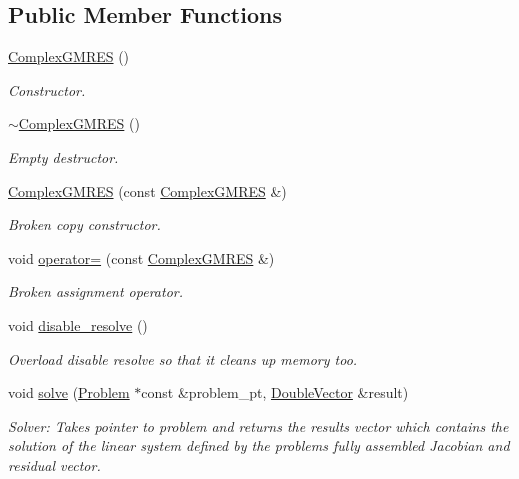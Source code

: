 \subsection*{Public Member Functions}
\begin{DoxyCompactItemize}
\item 
\hyperlink{classoomph_1_1ComplexGMRES_a8d0bfc83e16222c1eee97d8118505bae}{Complex\+G\+M\+R\+ES} ()
\begin{DoxyCompactList}\small\item\em Constructor. \end{DoxyCompactList}\item 
\hyperlink{classoomph_1_1ComplexGMRES_ade91020000a1b6bf316ff9753ac6498b}{$\sim$\+Complex\+G\+M\+R\+ES} ()
\begin{DoxyCompactList}\small\item\em Empty destructor. \end{DoxyCompactList}\item 
\hyperlink{classoomph_1_1ComplexGMRES_a834e97a93d141ece73e4f3aac2e8cd00}{Complex\+G\+M\+R\+ES} (const \hyperlink{classoomph_1_1ComplexGMRES}{Complex\+G\+M\+R\+ES} \&)
\begin{DoxyCompactList}\small\item\em Broken copy constructor. \end{DoxyCompactList}\item 
void \hyperlink{classoomph_1_1ComplexGMRES_a1b42167d4635b2ca294ed7aa843e9de5}{operator=} (const \hyperlink{classoomph_1_1ComplexGMRES}{Complex\+G\+M\+R\+ES} \&)
\begin{DoxyCompactList}\small\item\em Broken assignment operator. \end{DoxyCompactList}\item 
void \hyperlink{classoomph_1_1ComplexGMRES_a07db774f0aca4e71579c7c071e25a451}{disable\+\_\+resolve} ()
\begin{DoxyCompactList}\small\item\em Overload disable resolve so that it cleans up memory too. \end{DoxyCompactList}\item 
void \hyperlink{classoomph_1_1ComplexGMRES_a76987ec784cd80e6605c63ef8d0ec6b7}{solve} (\hyperlink{classoomph_1_1Problem}{Problem} $\ast$const \&problem\+\_\+pt, \hyperlink{classoomph_1_1DoubleVector}{Double\+Vector} \&result)
\begin{DoxyCompactList}\small\item\em Solver\+: Takes pointer to problem and returns the results vector which contains the solution of the linear system defined by the problem\textquotesingle{}s fully assembled Jacobian and residual vector. \end{DoxyCompactList}\item 

\end{DoxyCompactItemize}
